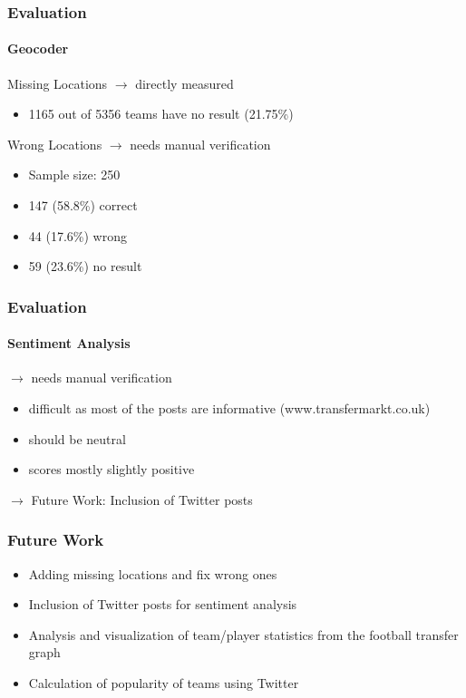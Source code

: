 \documentclass{beamer}
\begin{document}
	\begin{frame}
    \frametitle{Evaluation}
		\framesubtitle{Geocoder}
		\begin{block}{Missing Locations}
			$\rightarrow$ directly measured
			\begin{itemize}
      \item 1165 out of 5356 teams have no result (21.75\%)
			\end{itemize}
		\end{block}
	  \begin{block}{Wrong Locations}
			$\rightarrow$ needs manual verification
			\begin{itemize}
			\item Sample size: 250
      \item 147 (58.8\%) correct
			\item 44 (17.6\%) wrong 
			\item 59 (23.6\%) no result
			\end{itemize}
    \end{block}
  \end{frame}
	
	\begin{frame}
    \frametitle{Evaluation}
		\framesubtitle{Sentiment Analysis}
		$\rightarrow$ needs manual verification
		\begin{itemize}
		\item difficult as most of the posts are informative (www.transfermarkt.co.uk)
		\item should be neutral
		\item scores mostly slightly positive
		\end{itemize}
		$\rightarrow$ Future Work: Inclusion of Twitter posts 
  \end{frame}
	
	
	\begin{frame}
    \frametitle{Future Work}
		\begin{itemize}
      \item Adding missing locations and fix wrong ones
			\item Inclusion of Twitter posts for sentiment analysis
			\item Analysis and visualization of team/player statistics from the football transfer graph
			\item Calculation of popularity of teams using Twitter
		\end{itemize}
  \end{frame}
	
	
	
\end{document}
